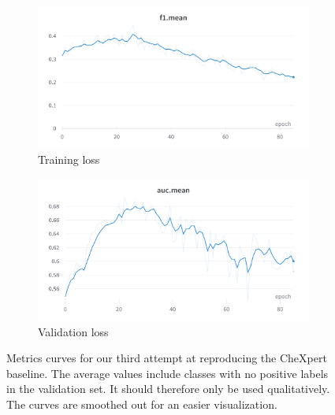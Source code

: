 \documentclass[11pt]{article}
\begin{document}
            \begin{figure}[H]
                 \centering
                 \begin{subfigure}[b]{0.45\textwidth}
                     \centering
                     \includegraphics[width=\textwidth]{plots/chexpert_f1_3}
                     \caption{Training loss}
                     \vspace{4ex}
                     \label{fig:chexpert_f1_3}
                 \end{subfigure}
                 \hfill
                 \begin{subfigure}[b]{0.45\textwidth}
                     \centering
                     \includegraphics[width=\textwidth]{plots/chexpert_auc_3}
                     \caption{Validation loss}
                     \vspace{4ex}
                     \label{fig:chexpert_auc_3}
                 \end{subfigure}

                 \caption{Metrics curves for our third attempt at reproducing the CheXpert baseline. The average values
                 include classes with no positive labels in the validation set. It should therefore only be used qualitatively. The curves are smoothed
                 out for an easier visualization.}

            \end{figure}
\end{document}
